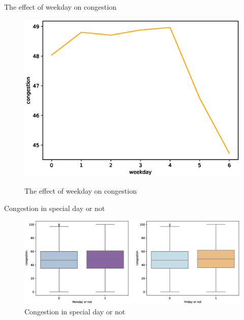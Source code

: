 \documentclass[
 size=14pt,
 paper=smartboard,  %
 mode=present, 		%
 display=slides, 	%
 style=tuliplab,  	%
 pauseslide,
 fleqn,leqno]{powerdot}
\begin{document}
\begin{slide}[toc=,bm=]{The effect of weekday on congestion}
	\begin{figure}
		\setlength{\abovecaptionskip}{-0.2cm} %
		\includegraphics[scale=0.9]{figure/weekday.eps}\\	
		\caption{The effect of weekday on congestion}
		\label{weekday}
	\end{figure}
\end{slide}
\begin{slide}[toc=,bm=]{Congestion in special day or not}
	\begin{figure}
		\setlength{\abovecaptionskip}{0.2cm} 
		\raggedleft
		\includegraphics[scale=0.65]{figure/is_weekend.eps}
		\centering
		\caption{Congestion in special day or not}
		\label{special}
	\end{figure}
\end{slide}
\end{document}
